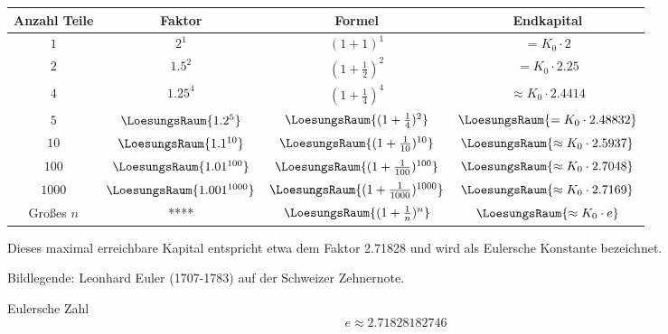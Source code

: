 \begin{tabular}{c|c|c|c} 
  Anzahl Teile  & Faktor                      & Formel          & Endkapital \\ \hline
  $1$           & $2^1$                      & $(1+1)^1$ & $= K_0 \cdot{} 2 $ \\ \hline
  $2$           & $1.5^2$                      & $(1+\frac12)^2$ & $= K_0 \cdot{} 2.25 $ \\ \hline
  $4$           & $1.25^4$                  & $(1+\frac14)^4$ & $\approx K_0 \cdot{} 2.4414 $ \\ \hline
  $5$           & $\LoesungsRaum{1.2^5}$  & $\LoesungsRaum{(1+\frac14)^2}$ & $\LoesungsRaum{= K_0 \cdot{} 2.48832} $ \\ \hline
  $10$           & $\LoesungsRaum{1.1^{10}}$  & $\LoesungsRaum{(1+\frac{1}{10})^{10}}$ & $\LoesungsRaum{\approx K_0 \cdot{} 2.5937} $ \\ \hline
  $100$           & $\LoesungsRaum{1.01^{100}}$  & $\LoesungsRaum{(1+\frac{1}{100})^{100}}$ & $\LoesungsRaum{\approx K_0 \cdot{} 2.7048 }$ \\ \hline
  $1000$           & $\LoesungsRaum{1.001^{1000}}$  & $\LoesungsRaum{(1+\frac{1}{1000})^{1000}}$ & $\LoesungsRaum{\approx K_0 \cdot{} 2.7169 }$ \\ \hline
  Großes $n$           & ****  & $\LoesungsRaum{(1+\frac{1}{n})^{n}}$ & $\LoesungsRaum{\approx K_0 \cdot{} e }$ \\ \hline
\end{tabular} 

Dieses maximal erreichbare Kapital entspricht etwa dem Faktor 2.71828 und
wird als Eulersche Konstante bezeichnet.

Bildlegende: Leonhard Euler (1707-1783) auf der Schweizer Zehnernote.

\begin{definition}{Eulersche Zahl}{}
$$e \approx 2.71828182746$$
\end{definition}
\newpage




